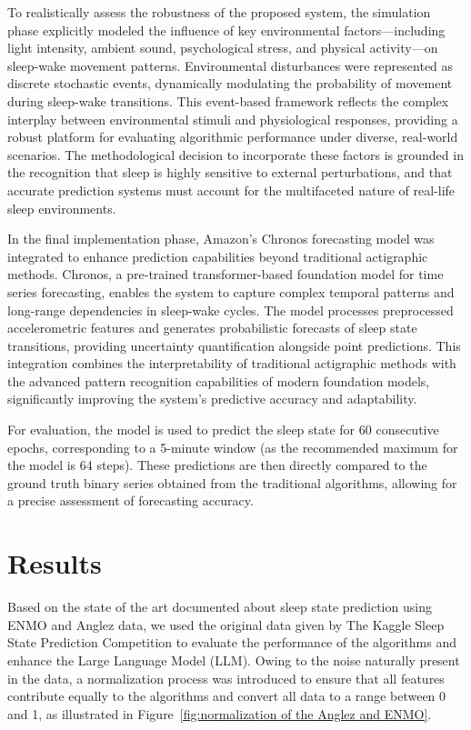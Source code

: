 \documentclass[conference]{IEEEtran}
\begin{document}
To realistically assess the robustness of the proposed system, the simulation phase explicitly modeled the influence of key environmental factors—including light intensity, ambient sound, psychological stress, and physical activity—on sleep-wake movement patterns. Environmental disturbances were represented as discrete stochastic events, dynamically modulating the probability of movement during sleep-wake transitions. This event-based framework reflects the complex interplay between environmental stimuli and physiological responses, providing a robust platform for evaluating algorithmic performance under diverse, real-world scenarios. The methodological decision to incorporate these factors is grounded in the recognition that sleep is highly sensitive to external perturbations, and that accurate prediction systems must account for the multifaceted nature of real-life sleep environments.

In the final implementation phase, Amazon's Chronos forecasting model \cite{ansari2024chronos} was integrated to enhance prediction capabilities beyond traditional actigraphic methods. Chronos, a pre-trained transformer-based foundation model for time series forecasting, enables the system to capture complex temporal patterns and long-range dependencies in sleep-wake cycles. The model processes preprocessed accelerometric features and generates probabilistic forecasts of sleep state transitions, providing uncertainty quantification alongside point predictions. This integration combines the interpretability of traditional actigraphic methods with the advanced pattern recognition capabilities of modern foundation models, significantly improving the system's predictive accuracy and adaptability.

For evaluation, the model is used to predict the sleep state for 60 consecutive epochs, corresponding to a 5-minute window (as the recommended maximum for the model is 64 steps). These predictions are then directly compared to the ground truth binary series obtained from the traditional algorithms, allowing for a precise assessment of forecasting accuracy.

\section{Results}

Based on the state of the art documented about sleep state prediction using ENMO and Anglez data, we used the original data given by The Kaggle Sleep State Prediction Competition to evaluate the performance of the algorithms and enhance the Large Language Model (LLM). Owing to the noise naturally present in the data, a normalization process was introduced to ensure that all features contribute equally to the algorithms and convert all data to a range between 0 and 1, as illustrated in Figure~\ref{fig:normalization of the Anglez and ENMO}.
\end{document}
